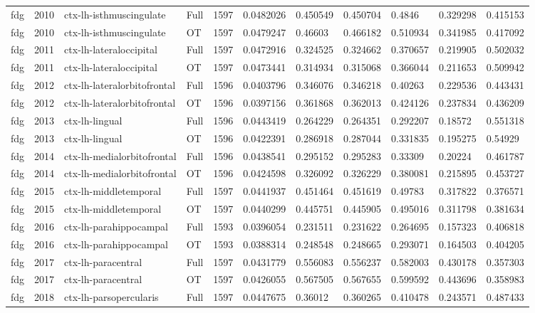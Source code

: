 \begin{landscape}
\begin{longtable}{lllllllllll}
fdg & 2010 & ctx-lh-isthmuscingulate & Full & 1597 & 0.0482026 & 0.450549 & 0.450704 & 0.4846 & 0.329298 & 0.415153 \\
fdg & 2010 & ctx-lh-isthmuscingulate & OT & 1597 & 0.0479247 & 0.46603 & 0.466182 & 0.510934 & 0.341985 & 0.417092 \\
fdg & 2011 & ctx-lh-lateraloccipital & Full & 1597 & 0.0472916 & 0.324525 & 0.324662 & 0.370657 & 0.219905 & 0.502032 \\
fdg & 2011 & ctx-lh-lateraloccipital & OT & 1597 & 0.0473441 & 0.314934 & 0.315068 & 0.366044 & 0.211653 & 0.509942 \\
fdg & 2012 & ctx-lh-lateralorbitofrontal & Full & 1596 & 0.0403796 & 0.346076 & 0.346218 & 0.40263 & 0.229536 & 0.443431 \\
fdg & 2012 & ctx-lh-lateralorbitofrontal & OT & 1596 & 0.0397156 & 0.361868 & 0.362013 & 0.424126 & 0.237834 & 0.436209 \\
fdg & 2013 & ctx-lh-lingual & Full & 1596 & 0.0443419 & 0.264229 & 0.264351 & 0.292207 & 0.18572 & 0.551318 \\
fdg & 2013 & ctx-lh-lingual & OT & 1596 & 0.0422391 & 0.286918 & 0.287044 & 0.331835 & 0.195275 & 0.54929 \\
fdg & 2014 & ctx-lh-medialorbitofrontal & Full & 1596 & 0.0438541 & 0.295152 & 0.295283 & 0.33309 & 0.20224 & 0.461787 \\
fdg & 2014 & ctx-lh-medialorbitofrontal & OT & 1596 & 0.0424598 & 0.326092 & 0.326229 & 0.380081 & 0.215895 & 0.453727 \\
fdg & 2015 & ctx-lh-middletemporal & Full & 1597 & 0.0441937 & 0.451464 & 0.451619 & 0.49783 & 0.317822 & 0.376571 \\
fdg & 2015 & ctx-lh-middletemporal & OT & 1597 & 0.0440299 & 0.445751 & 0.445905 & 0.495016 & 0.311798 & 0.381634 \\
fdg & 2016 & ctx-lh-parahippocampal & Full & 1593 & 0.0396054 & 0.231511 & 0.231622 & 0.264695 & 0.157323 & 0.406818 \\
fdg & 2016 & ctx-lh-parahippocampal & OT & 1593 & 0.0388314 & 0.248548 & 0.248665 & 0.293071 & 0.164503 & 0.404205 \\
fdg & 2017 & ctx-lh-paracentral & Full & 1597 & 0.0431779 & 0.556083 & 0.556237 & 0.582003 & 0.430178 & 0.357303 \\
fdg & 2017 & ctx-lh-paracentral & OT & 1597 & 0.0426055 & 0.567505 & 0.567655 & 0.599592 & 0.443696 & 0.358983 \\
fdg & 2018 & ctx-lh-parsopercularis & Full & 1597 & 0.0447675 & 0.36012 & 0.360265 & 0.410478 & 0.243571 & 0.487433 \\

\end{longtable}
\end{landscape}
